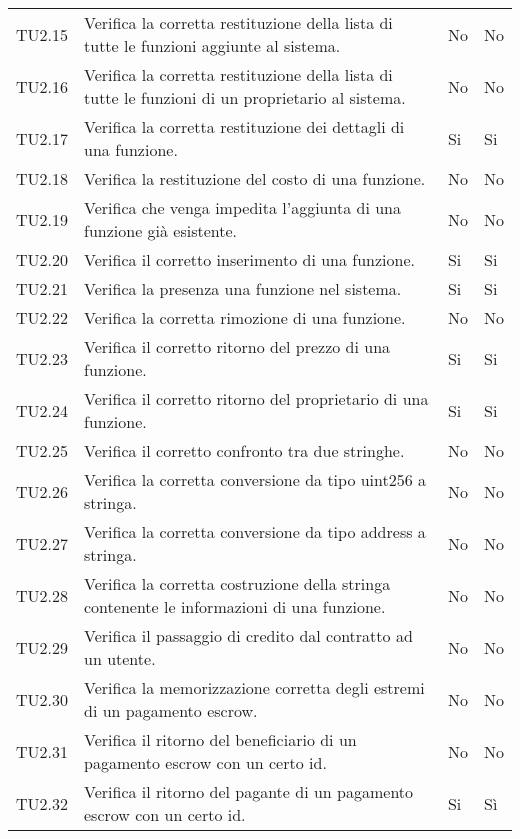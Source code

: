 \begin{longtable}{
		>{\centering}p{}
		>{}p{}
		>{\centering}p{}
		>{\centering}p{} }
TU2.15  &  Verifica la corretta restituzione della lista di tutte le funzioni aggiunte al sistema. &
No & No \tabularnewline

TU2.16  &  Verifica la corretta restituzione della lista di tutte le funzioni di un proprietario al sistema. &
No & No \tabularnewline

TU2.17  &  Verifica la corretta restituzione dei dettagli di una funzione. &
Si & Si \tabularnewline

TU2.18  &  Verifica la restituzione del costo di una funzione. &
No & No \tabularnewline

TU2.19  &  Verifica che venga impedita l'aggiunta di una funzione già esistente. &
No & No \tabularnewline

TU2.20  &  Verifica il corretto inserimento di una funzione. &%
Si & Si \tabularnewline

TU2.21  &  Verifica la presenza una funzione nel sistema.	&
Si & Si \tabularnewline

TU2.22  &  Verifica la corretta rimozione di una funzione. &
No & No \tabularnewline

TU2.23  &  Verifica il corretto ritorno del prezzo di una funzione. &
Si & Si \tabularnewline

TU2.24  &  Verifica il corretto ritorno del proprietario di una funzione. &
Si & Si \tabularnewline

TU2.25  &  Verifica il corretto confronto tra due stringhe. &
No & No \tabularnewline

TU2.26  &  Verifica la corretta conversione da tipo uint256 a stringa. &
No & No \tabularnewline

TU2.27  &  Verifica la corretta conversione da tipo address a stringa. &
No & No \tabularnewline

TU2.28  &  Verifica la corretta costruzione della stringa contenente le informazioni di una funzione. &
No & No \tabularnewline

TU2.29  &  Verifica il passaggio di credito dal contratto ad un utente. & %
No & No \tabularnewline

TU2.30  &  Verifica la memorizzazione corretta degli estremi di un pagamento escrow. &
No & No \tabularnewline

TU2.31  &  Verifica il ritorno del beneficiario di un pagamento escrow con un certo id. &
No & No \tabularnewline

TU2.32  &  Verifica il ritorno del pagante di un pagamento escrow con un certo id.  &
Si & Sì \tabularnewline


\end{longtable}
